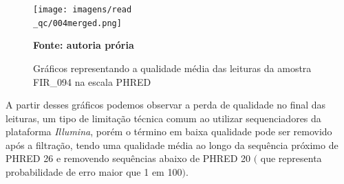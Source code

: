 \begin{figure}[H]
	\caption{Gráficos representando a qualidade média das leituras da amostra FIR\_094 na escala PHRED}
	\centering
	\texttt{[image: imagens/read\\\_qc/004merged.png]} \\
	\centering
    \begin{small}\textbf{Fonte: autoria prória}\end{small}
\end{figure}
\vspace{\floatsep}

A partir desses gráficos podemos observar a perda de qualidade no final das leituras, um tipo de limitação
técnica comum ao utilizar sequenciadores da plataforma \textit{Illumina}, porém o término em baixa qualidade
pode ser removido após a filtração, tendo uma qualidade média ao longo da sequência próximo de PHRED 26 e
removendo sequências abaixo de PHRED 20 $($ que representa probabilidade de erro maior que 1 em 100$)$.


